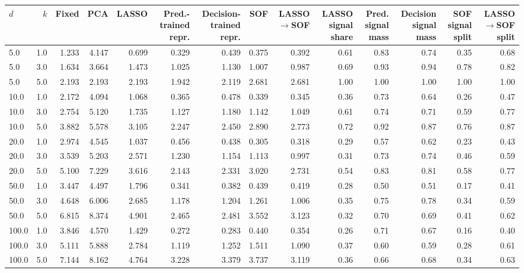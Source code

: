 \begin{tabular}{lrrrrrrrrrrrrr}
\toprule
$d$ & $k$ & Fixed & PCA & LASSO & Pred.-trained repr. & Decision-trained repr. & SOF & LASSO$\to$SOF & LASSO signal share & Pred. signal mass & Decision signal mass & SOF signal split & LASSO$\to$SOF split \\
\midrule
5.0 & 1.0 & 1.233 & 4.147 & 0.699 & 0.329 & 0.439 & 0.375 & 0.392 & 0.61 & 0.83 & 0.74 & 0.35 & 0.68 \\
5.0 & 3.0 & 1.634 & 3.664 & 1.473 & 1.025 & 1.130 & 1.007 & 0.987 & 0.69 & 0.93 & 0.94 & 0.78 & 0.82 \\
5.0 & 5.0 & 2.193 & 2.193 & 2.193 & 1.942 & 2.119 & 2.681 & 2.681 & 1.00 & 1.00 & 1.00 & 1.00 & 1.00 \\
10.0 & 1.0 & 2.172 & 4.094 & 1.068 & 0.365 & 0.478 & 0.339 & 0.345 & 0.36 & 0.73 & 0.64 & 0.26 & 0.47 \\
10.0 & 3.0 & 2.754 & 5.120 & 1.735 & 1.127 & 1.180 & 1.142 & 1.049 & 0.61 & 0.74 & 0.71 & 0.59 & 0.77 \\
10.0 & 5.0 & 3.882 & 5.578 & 3.105 & 2.247 & 2.450 & 2.890 & 2.773 & 0.72 & 0.92 & 0.87 & 0.76 & 0.87 \\
20.0 & 1.0 & 2.974 & 4.545 & 1.037 & 0.456 & 0.438 & 0.305 & 0.318 & 0.29 & 0.57 & 0.62 & 0.23 & 0.43 \\
20.0 & 3.0 & 3.539 & 5.203 & 2.571 & 1.230 & 1.154 & 1.113 & 0.997 & 0.31 & 0.73 & 0.74 & 0.46 & 0.59 \\
20.0 & 5.0 & 5.100 & 7.229 & 3.616 & 2.143 & 2.331 & 3.020 & 2.731 & 0.54 & 0.83 & 0.81 & 0.58 & 0.77 \\
50.0 & 1.0 & 3.447 & 4.497 & 1.796 & 0.341 & 0.382 & 0.439 & 0.419 & 0.28 & 0.50 & 0.51 & 0.17 & 0.41 \\
50.0 & 3.0 & 4.648 & 6.006 & 2.685 & 1.178 & 1.204 & 1.261 & 1.006 & 0.35 & 0.75 & 0.78 & 0.34 & 0.59 \\
50.0 & 5.0 & 6.815 & 8.374 & 4.901 & 2.465 & 2.481 & 3.552 & 3.123 & 0.32 & 0.70 & 0.69 & 0.41 & 0.62 \\
100.0 & 1.0 & 3.846 & 4.570 & 1.429 & 0.272 & 0.283 & 0.440 & 0.354 & 0.26 & 0.71 & 0.67 & 0.16 & 0.40 \\
100.0 & 3.0 & 5.111 & 5.888 & 2.784 & 1.119 & 1.252 & 1.511 & 1.090 & 0.37 & 0.60 & 0.59 & 0.28 & 0.61 \\
100.0 & 5.0 & 7.144 & 8.162 & 4.764 & 3.228 & 3.379 & 3.737 & 3.119 & 0.36 & 0.66 & 0.68 & 0.34 & 0.63 \\
\bottomrule
\end{tabular}

